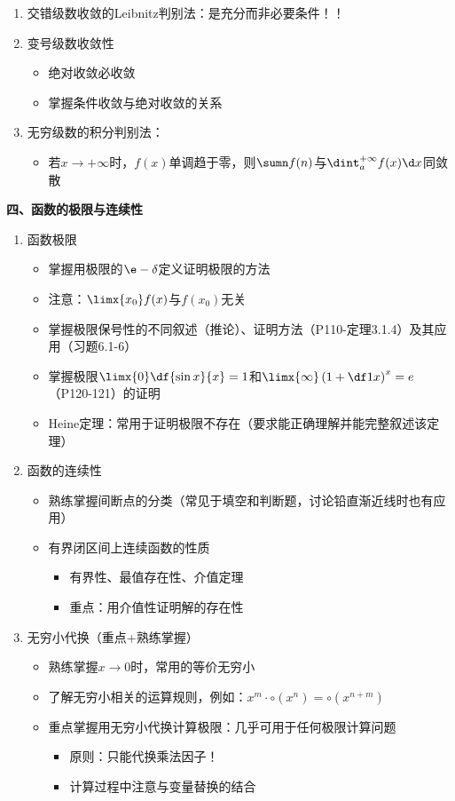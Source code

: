 \begin{enumerate}
  \item 交错级数收敛的Leibnitz判别法：是充分而非必要条件！！
  \item 变号级数收敛性
  \begin{itemize}
    \item 绝对收敛必收敛
    \item 掌握条件收敛与绝对收敛的关系
  \end{itemize}
  \item 无穷级数的积分判别法：
  \begin{itemize}
    \item 若$x\to +\infty$时，$f(x)$单调趋于零，则$\sumn
    f(n)$与$\dint_a^{+\infty}f(x)\d x$同敛散
  \end{itemize}
\end{enumerate}

\bigskip

{\bf 四、函数的极限与连续性}
\begin{enumerate}
  \item 函数极限
  \begin{itemize}
    \item 掌握用极限的$\e-\delta$定义证明极限的方法
    \item 注意：$\limx{x_0}f(x)$与$f(x_0)$无关
    \item 掌握极限保号性的不同叙述（推论）、证明方法（P110-定理3.1.4）及其应用（习题6.1-6）
    \item 掌握极限$\limx{0}\df{\sin
      x}{x}=1$和$\limx{\infty}\left(1+\df 1x\right)^x=e$（P120-121）的证明
    \item Heine定理：常用于证明极限不存在（要求能正确理解并能完整叙述该定理）
  \end{itemize}
  \item 函数的连续性
  \begin{itemize}
    \item 熟练掌握间断点的分类（常见于填空和判断题，讨论铅直渐近线时也有应用）
    \item 有界闭区间上连续函数的性质
    \begin{itemize}
      \item 有界性、最值存在性、介值定理
      \item 重点：用介值性证明解的存在性
    \end{itemize}
  \end{itemize}
  \item 无穷小代换（重点+熟练掌握）
  \begin{itemize}
    \item 熟练掌握$x\to 0$时，常用的等价无穷小
    \item 了解无穷小相关的运算规则，例如：$x^m\cdot\circ(x^n)=\circ(x^{n+m})$
    \item 重点掌握用无穷小代换计算极限：几乎可用于任何极限计算问题
    \begin{itemize}
      \item 原则：只能代换乘法因子！
      \item 计算过程中注意与变量替换的结合
    \end{itemize}
  \end{itemize}
\end{enumerate}

